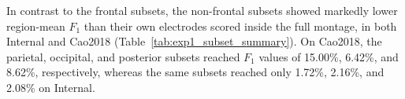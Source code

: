 In contrast to the frontal subsets, the non-frontal subsets showed markedly lower region-mean $F_1$ than their own electrodes scored inside the full montage, in both Internal and Cao2018 (Table~\ref{tab:exp1_subset_summary}). On Cao2018, the parietal, occipital, and posterior subsets reached $F_1$ values of 15.00\%, 6.42\%, and 8.62\%, respectively, whereas the same subsets reached only 1.72\%, 2.16\%, and 2.08\% on Internal.
